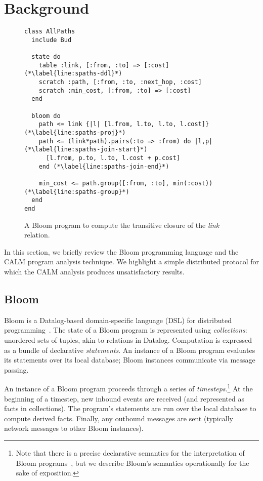 \section{Background}
\label{sec:background}

\begin{figure}[t]
\begin{scriptsize}
\begin{lstlisting}
class AllPaths
  include Bud

  state do
    table :link, [:from, :to] => [:cost] (*\label{line:spaths-ddl}*)
    scratch :path, [:from, :to, :next_hop, :cost]
    scratch :min_cost, [:from, :to] => [:cost]
  end

  bloom do
    path <= link {|l| [l.from, l.to, l.to, l.cost]} (*\label{line:spaths-proj}*)
    path <= (link*path).pairs(:to => :from) do |l,p| (*\label{line:spaths-join-start}*)
      [l.from, p.to, l.to, l.cost + p.cost]
    end (*\label{line:spaths-join-end}*)

    min_cost <= path.group([:from, :to], min(:cost)) (*\label{line:spaths-group}*)
  end
end
\end{lstlisting}
\end{scriptsize}
\caption{A Bloom program to compute the transitive closure of the
  \emph{link} relation.}
\label{fig:bloom-spaths}
\end{figure}

In this section, we briefly review the Bloom programming language and the CALM
program analysis technique.  We highlight a simple distributed protocol for
which the CALM analysis produces unsatisfactory results.

\subsection{Bloom}
\label{sec:bg-bloom}

Bloom is a Datalog-based domain-specific language (DSL) for distributed
programming~\cite{Alvaro2011,bloom}. The state of a Bloom program is represented
using \emph{collections}: unordered sets of tuples, akin to relations in
Datalog. Computation is expressed as a bundle of declarative
\emph{statements}. An instance of a Bloom program evaluates its statements over
its local database; Bloom instances communicate via message passing.

An instance of a Bloom program proceeds through a series of
\emph{timesteps}.\footnote{Note that there is a precise declarative semantics
  for the interpretation of Bloom programs~\cite{dedalus}, but we describe
  Bloom's semantics operationally for the sake of exposition.} At the beginning
of a timestep, new inbound events are received (and represented as facts in
collections). The program's statements are run over the local database to
compute derived facts. Finally, any outbound messages are sent (typically
network messages to other Bloom instances).

